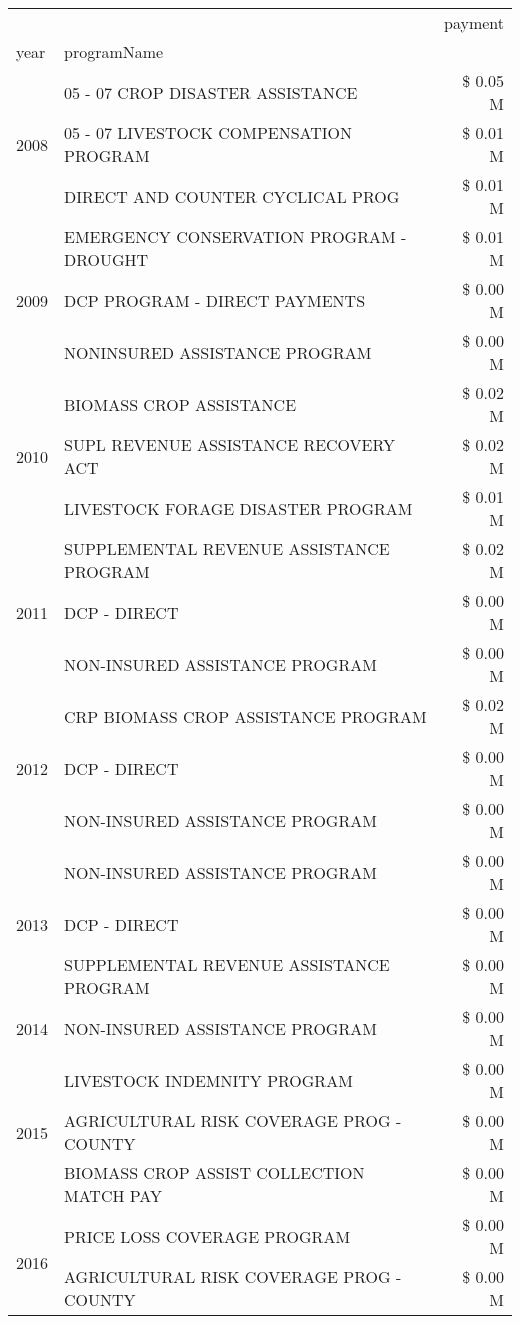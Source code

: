 \begin{tabular}{llr}
\toprule
 &  & payment \\
year & programName &  \\
\midrule
\multirow[t]{3}{*}{2008} & 05 - 07 CROP DISASTER ASSISTANCE & \$ 0.05 M \\
 & 05 - 07 LIVESTOCK COMPENSATION PROGRAM & \$ 0.01 M \\
 & DIRECT AND COUNTER CYCLICAL PROG & \$ 0.01 M \\
\cline{1-3}
\multirow[t]{3}{*}{2009} & EMERGENCY CONSERVATION PROGRAM - DROUGHT & \$ 0.01 M \\
 & DCP PROGRAM - DIRECT PAYMENTS & \$ 0.00 M \\
 & NONINSURED ASSISTANCE PROGRAM & \$ 0.00 M \\
\cline{1-3}
\multirow[t]{3}{*}{2010} & BIOMASS CROP ASSISTANCE & \$ 0.02 M \\
 & SUPL REVENUE ASSISTANCE RECOVERY ACT & \$ 0.02 M \\
 & LIVESTOCK FORAGE DISASTER  PROGRAM & \$ 0.01 M \\
\cline{1-3}
\multirow[t]{3}{*}{2011} & SUPPLEMENTAL REVENUE ASSISTANCE PROGRAM & \$ 0.02 M \\
 & DCP - DIRECT & \$ 0.00 M \\
 & NON-INSURED ASSISTANCE PROGRAM & \$ 0.00 M \\
\cline{1-3}
\multirow[t]{3}{*}{2012} & CRP BIOMASS CROP ASSISTANCE PROGRAM & \$ 0.02 M \\
 & DCP - DIRECT & \$ 0.00 M \\
 & NON-INSURED ASSISTANCE PROGRAM & \$ 0.00 M \\
\cline{1-3}
\multirow[t]{3}{*}{2013} & NON-INSURED ASSISTANCE PROGRAM & \$ 0.00 M \\
 & DCP - DIRECT & \$ 0.00 M \\
 & SUPPLEMENTAL REVENUE ASSISTANCE PROGRAM & \$ 0.00 M \\
\cline{1-3}
2014 & NON-INSURED ASSISTANCE PROGRAM & \$ 0.00 M \\
\cline{1-3}
\multirow[t]{3}{*}{2015} & LIVESTOCK INDEMNITY PROGRAM & \$ 0.00 M \\
 & AGRICULTURAL RISK COVERAGE PROG - COUNTY & \$ 0.00 M \\
 & BIOMASS CROP ASSIST COLLECTION MATCH PAY & \$ 0.00 M \\
\cline{1-3}
\multirow[t]{2}{*}{2016} & PRICE LOSS COVERAGE PROGRAM & \$ 0.00 M \\
 & AGRICULTURAL RISK COVERAGE PROG - COUNTY & \$ 0.00 M \\

\end{tabular}
